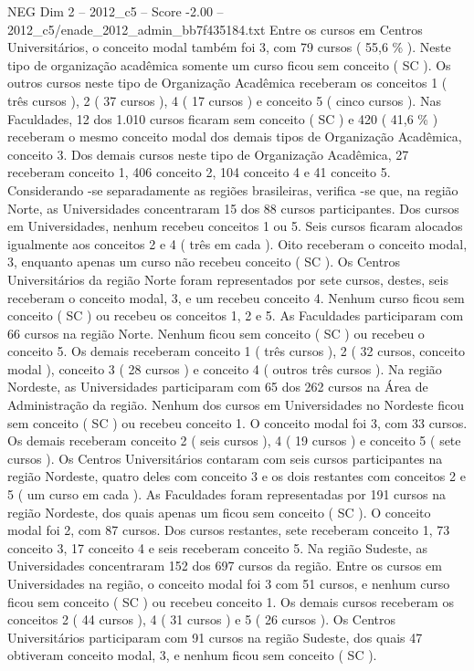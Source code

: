 \begin{textsample}{NEG Dim 2 – 2012\_c5 – Score -2.00 – 2012\_c5/enade\_2012\_admin\_bb7f435184.txt}
Entre os cursos em Centros Universitários, o conceito modal também foi 3, com 79 cursos ( 55,6 \% ).
Neste tipo de organização acadêmica somente um curso ficou sem conceito ( SC ).
Os outros cursos neste tipo de Organização Acadêmica receberam os conceitos 1 ( três cursos ), 2 ( 37 cursos ), 4 ( 17 cursos ) e conceito 5 ( cinco cursos ).
Nas Faculdades, 12 dos 1.010 cursos ficaram sem conceito ( SC ) e 420 ( 41,6 \% ) receberam o mesmo conceito modal dos demais tipos de Organização Acadêmica, conceito 3.
Dos demais cursos neste tipo de Organização Acadêmica, 27 receberam conceito 1, 406 conceito 2, 104 conceito 4 e 41 conceito 5.
Considerando -se separadamente as regiões brasileiras, verifica -se que, na região Norte, as Universidades concentraram 15 dos 88 cursos participantes.
Dos cursos em Universidades, nenhum recebeu conceitos 1 ou 5.
Seis cursos ficaram alocados igualmente aos conceitos 2 e 4 ( três em cada ).
Oito receberam o conceito modal, 3, enquanto apenas um curso não recebeu conceito ( SC ).
Os Centros Universitários da região Norte foram representados por sete cursos, destes, seis receberam o conceito modal, 3, e um recebeu conceito 4.
Nenhum curso ficou sem conceito ( SC ) ou recebeu os conceitos 1, 2 e 5.
As Faculdades participaram com 66 cursos na região Norte.
Nenhum ficou sem conceito ( SC ) ou recebeu o conceito 5.
Os demais receberam conceito 1 ( três cursos ), 2 ( 32 cursos, conceito modal ), conceito 3 ( 28 cursos ) e conceito 4 ( outros três cursos ).
Na região Nordeste, as Universidades participaram com 65 dos 262 cursos na Área de Administração da região.
Nenhum dos cursos em Universidades no Nordeste ficou sem conceito ( SC ) ou recebeu conceito 1.
O conceito modal foi 3, com 33 cursos.
Os demais receberam conceito 2 ( seis cursos ), 4 ( 19 cursos ) e conceito 5 ( sete cursos ).
Os Centros Universitários contaram com seis cursos participantes na região Nordeste, quatro deles com conceito 3 e os dois restantes com conceitos 2 e 5 ( um curso em cada ).
As Faculdades foram representadas por 191 cursos na região Nordeste, dos quais apenas um ficou sem conceito ( SC ).
O conceito modal foi 2, com 87 cursos.
Dos cursos restantes, sete receberam conceito 1, 73 conceito 3, 17 conceito 4 e seis receberam conceito 5.
Na região Sudeste, as Universidades concentraram 152 dos 697 cursos da região.
Entre os cursos em Universidades na região, o conceito modal foi 3 com 51 cursos, e nenhum curso ficou sem conceito ( SC ) ou recebeu conceito 1.
Os demais cursos receberam os conceitos 2 ( 44 cursos ), 4 ( 31 cursos ) e 5 ( 26 cursos ).
Os Centros Universitários participaram com 91 cursos na região Sudeste, dos quais 47 obtiveram conceito modal, 3, e nenhum ficou sem conceito ( SC ).

\end{textsample}
